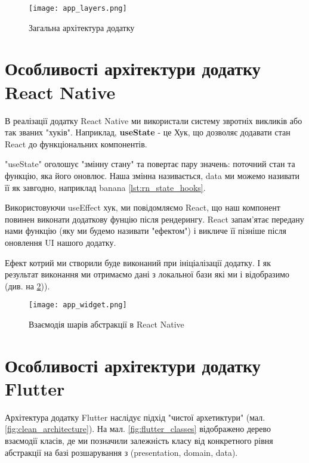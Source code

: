 \begin{figure}
    \begin{center}
        \texttt{[image: app\_layers.png]}
        \caption{Загальна архітектура додатку}
        \label{fig:gen_app_architecture}
    \end{center}
\end{figure}

\section{Особливості архітектури додатку React Native}
\label{sec:kn_app_architecture}
В реалізації додатку React Native ми використали систему звротніх викликів або так званих "хуків".
Наприклад, \textbf{useState} - це Хук, що дозволяє додавати стан React до функціональних компонентів.

"useState" оголошує "змінну стану" та повертає пару значень: поточний стан та функцію, яка його оновлює.
Наша змінна називається, data ми можемо називати її як завгодно, наприклад banana \ref{lst:rn_state_hooks}.

Використовуючи useEffect хук, ми повідомляємо React, що наш компонент повинен виконати додаткову фунцію після рендерингу.
React запам'ятає передану нами функцію (яку ми будемо називати "ефектом") і викличе її пізніше після оновлення UI нашого додатку.

Ефект котрий ми створили буде виконаний при ініціалізації додатку. І як результат виконання ми отримаємо дані з локальної бази які ми і відобразимо (див. на \ref{fig:rn_realm})).

\begin{figure}
    \begin{center}
        \texttt{[image: app\_widget.png]}
        \caption{Взаємодія шарів абстракції в React Native}
        \label{fig:rn_realm}
    \end{center}
\end{figure}


\section{Особливості архітектури додатку Flutter}
\label{sec:flutter_network_app}

Архітектура додатку Flutter наслідує підхід "чистої архетиктури" (мал. \ref{fig:clean_architecture}).
На мал. \ref{fig:flutter_classes} відображено дерево взаємодії класів, де ми позначили залежність класу
від конкретного рівня абстракції на базі розшарування з (presentation, domain, data).

